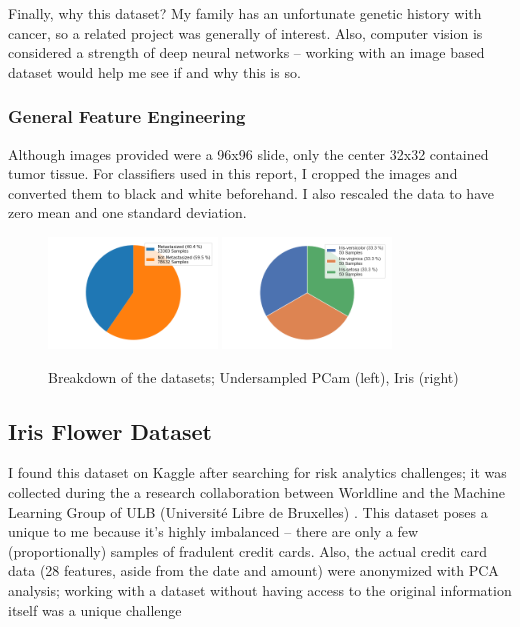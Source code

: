 \documentclass[a4paper]{article}
\begin{document}
Finally, why this dataset? My family has an unfortunate genetic history with cancer, so a related project was generally of interest. Also, computer vision is considered a strength of deep neural networks -- working with an image based dataset would help me see if and why this is so.

\subsubsection{General Feature Engineering}
Although images provided were a 96x96 slide, only the center 32x32 contained tumor tissue. For classifiers used in this report, I cropped the images and converted them to black and white beforehand. I also rescaled the data to have zero mean and one standard deviation. 

\begin{figure}
  \centering
  \includegraphics[width=0.4\textwidth]{images/pcamDistr.png}
  \includegraphics[width=0.4\textwidth]{images/irisDistr.png}
  \caption{Breakdown of the datasets; Undersampled PCam (left), Iris (right)}
\end{figure}

\subsection{Iris Flower Dataset}

I found this dataset on Kaggle after searching for risk analytics challenges; it was collected during the a research collaboration between Worldline and the Machine Learning Group of ULB (Université Libre de Bruxelles) \autocite{dal2015calibrating}. This dataset poses a unique to me because it's highly imbalanced -- there are only a few (proportionally) samples of fradulent credit cards. Also, the actual credit card data (28 features, aside from the date and amount) were anonymized with PCA analysis; working with a dataset without having access to the original information itself was a unique challenge
\end{document}
